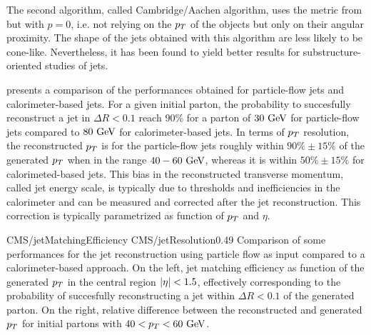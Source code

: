         The second algorithm, called Cambridge/Aachen algorithm, uses the metric from
         but with $p = 0$, i.e. not relying on the $p_T$ of
        the objects but only on their angular proximity. The shape of the jets obtained with
        this algorithm are less likely to be cone-like. Nevertheless, it has been found to
        yield better results for substructure-oriented studies of jets.

         presents a comparison of the performances obtained
        for particle-flow jets and calorimeter-based jets. For a given initial parton, the
        probability to succesfully reconstruct a jet in $\Delta R < 0.1$ reach 90\% for
        a parton of $30~\text{GeV}$ for particle-flow jets compared to $80~\text{GeV}$ for
        calorimeter-based jets. In terms of $p_T$ resolution, the reconstructed $p_T$ is
        for the particle-flow jets roughly within $90\% \pm 15\%$ of the generated $p_T$
        when in the range $40-60~\text{GeV}$, whereas it is within $50\% \pm 15\%$ for
        calorimeted-based jets. This bias in the reconstructed transverse momentum, called
        jet energy scale, is typically due to thresholds and inefficiencies in the calorimeter
        and can be measured and corrected after the jet reconstruction. This correction is
        typically parametrized as function of $p_T$ and $\eta$.


        {CMS/jetMatchingEfficiency}
        {CMS/jetResolution}{0.49}
        {Comparison of some performances for the jet reconstruction using particle flow as
        input compared to a calorimeter-based approach. On the left, jet matching efficiency
        as function of the generated $p_T$ in the central region $\left| \eta \right| < 1.5$, effectively
        corresponding to the probability of succesfully reconstructing a jet within
        $\Delta R < 0.1$ of the generated parton. On the right, relative difference between
        the reconstructed and generated $p_T$ for initial partons with $40 < p_T < 60~\text{GeV}$.}

